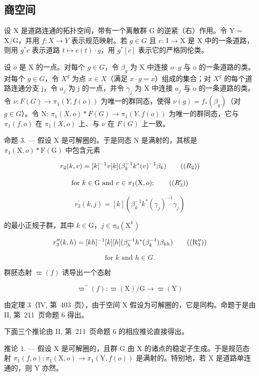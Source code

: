 \subsection{商空间}

设 X 是道路连通的拓扑空间，带有一个离散群 G 的逆紧（右）作用。令 Y = X/G，并用 \(f: X \to Y\) 表示规范映射。若 \(g \in G\) 且 c: I → X 是 X 中的一条道路，则用 \(g^{*}c\) 表示道路 \(t \mapsto c(t) \cdot g\)，用 \(g^{*}[c]\) 表示它的严格同伦类。

设 \(o\) 是 X 的一点。对每个 \(g \in G\)，令 \(\beta_{g}\) 为 X 中连接 \(o \cdot g\) 与 o 的一条道路的类。对每个 \(g \in G\)，令 \(X^{g}\) 为点 \(x \in X\)（满足 \(x \cdot g = x\)）组成的集合；对 \(X^{g}\) 的每个道路连通分支 j，令 \(a_{j}\) 为 j 的一点，并令 \(\gamma_{j}\) 为 X 中连接 \(a_{j}\) 与 o 的一条道路的类。令 \(\nu: F(G) \to \pi_{1}(Y, f(o))\) 为唯一的群同态，使得 \(\nu(g) = f_{*}(\beta_{g})\)（对 \(g \in G\)）。令 N: \(\pi_{1}(X, o) * F(G) \to \pi_{1}(Y, f(o))\) 为唯一的群同态，它与 \(\pi_{1}(f, o)\) 在 \(\pi_{1}(X, o)\) 上、与 \(\nu\) 在 \(F(G)\) 上一致。

命题 3. --- 假设 X 是可解圈的。于是同态 N 是满射的，其核是 \(\pi_{1}(\mathrm{X},o)*\mathrm{F}(\mathrm{G})\) 中包含元素

\[
r _ {2} (k, v) = [ k ] ^ {- 1} v [ k ] (\beta_ {k} ^ {- 1} k ^ {*} (v) ^ {- 1} \beta_ {k})\tag{\((R_{2})\)}
\]

\[
\text {for } k \in \mathrm{G} \text { and } v \in \pi_ {1} (\mathrm{X}, o);\tag{\((R_{3}^{\prime})\)}
\]

\[
r _ {3} ^ {\prime} (k, j) = [ k ] (\beta_ {k} ^ {- 1} k ^ {*} (\gamma_ {j}) ^ {- 1} \gamma_ {j})
\]

的最小正规子群，其中 \(k\in \mathrm{G}\)，\(j\in \pi_0(\mathrm{X}^k)\)

\[
r _ {3} ^ {\prime \prime} (k, h) = [ k h ] ^ {- 1} [ k ] [ h ] (\beta_ {h} ^ {- 1} h ^ {*} (\beta_ {k} ^ {- 1}) \beta_ {k h})\tag{\((\mathrm{R}_{3}^{\prime \prime})\)}
\]

\[
\text {for } k \text { and } h \in G.
\]

群胚态射 \(\varpi(f)\) 诱导出一个态射

\[
\varpi^ {\prime \prime} (f) \colon \varpi (\mathrm{X}) / \mathrm{G} \to \varpi (\mathrm{Y})
\]

由定理 3（IV, 第~403~页），由于空间 X 假设为可解圈的，它是同构。命题于是由 II, 第~211~页命题 6 得出。

下面三个推论由 II, 第~211~页命题 6 的相应推论直接得出。

推论 1. --- 假设 X 是可解圈的，且群 G 由 X 的诸点的稳定子生成。于是规范态射 \(\pi_{1}(f,o)\colon\pi_{1}(\mathrm{X},o)\to\pi_{1}(\mathrm{Y},f(o))\) 是满射的。特别地，若 X 是道路单连通的，则 Y 亦然。

